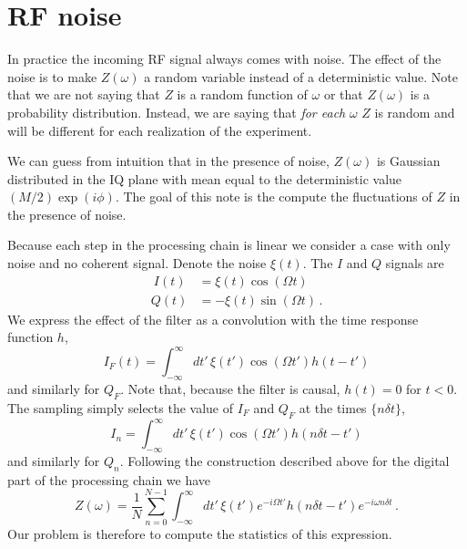 \section{RF noise}

In practice the incoming RF signal always comes with noise.
The effect of the noise is to make $Z(\omega)$ a random variable instead of a deterministic value.
Note that we are not saying that $Z$ is a random function of $\omega$ or that $Z(\omega)$ is a probability distribution.
Instead, we are saying that \emph{for each }$\omega$ $Z$ is random and will be different for each realization of the experiment.

We can guess from intuition that in the presence of noise, $Z(\omega)$ is Gaussian distributed in the IQ plane with mean equal to the deterministic value $(M/2)\exp(i \phi)$.
The goal of this note is the compute the fluctuations of $Z$ in the presence of noise.

Because each step in the processing chain is linear we consider a case with only noise and no coherent signal.
Denote the noise $\xi(t)$.
The $I$ and $Q$ signals are
\begin{align}\
I(t) &= \xi(t) \cos(\Omega t) \\
Q(t) &= - \xi(t) \sin(\Omega t) \, .
\end{align}
We express the effect of the filter as a convolution with the time response function $h$,
\begin{equation}
I_F(t) = \int_{-\infty}^\infty dt' \, \xi(t') \cos(\Omega t') h(t - t')
\end{equation}
and similarly for $Q_F$.
Note that, because the filter is causal, $h(t)=0$ for $t<0$.
The sampling simply selects the value of $I_F$ and $Q_F$ at the times $\{ n \delta t \}$,
\begin{equation}
I_n = \int_{-\infty}^\infty dt' \, \xi(t') \cos(\Omega t') h(n \delta t - t')
\end{equation}
and similarly for $Q_n$.
Following the construction described above for the digital part of the processing chain we have
\begin{equation}
Z(\omega) =
\frac{1}{N}\sum_{n=0}^{N-1} \int_{-\infty}^\infty dt' \, \xi(t') e^{-i \Omega t'} h(n \delta t - t') e^{-i \omega n \delta t} \, .
\end{equation}
Our problem is therefore to compute the statistics of this expression.

